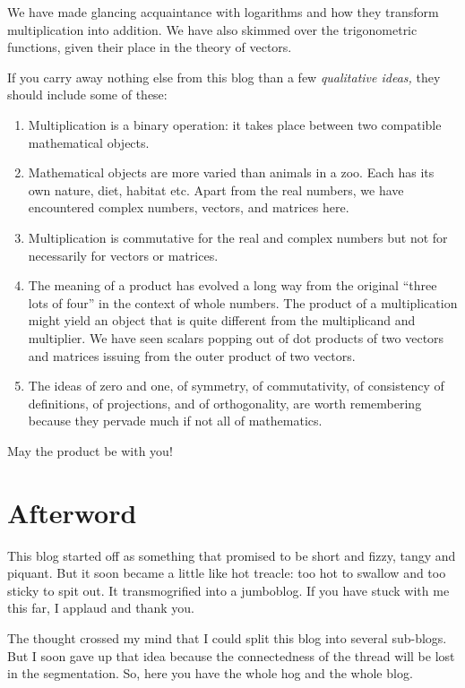 \documentclass[
  a4paper,
]{article}
\begin{document}
We have made glancing acquaintance with logarithms and how they
transform multiplication into addition. We have also skimmed over the
trigonometric functions, given their place in the theory of vectors.

If you carry away nothing else from this blog than a few
\emph{qualitative ideas,} they should include some of these:

\begin{enumerate}
\item
  Multiplication is a binary operation: it takes place between two
  compatible mathematical objects.
\item
  Mathematical objects are more varied than animals in a zoo. Each has
  its own nature, diet, habitat etc. Apart from the real numbers, we
  have encountered complex numbers, vectors, and matrices here.
\item
  Multiplication is commutative for the real and complex numbers but not
  for necessarily for vectors or matrices.
\item
  The meaning of a product has evolved a long way from the original
  ``three lots of four'' in the context of whole numbers. The product of
  a multiplication might yield an object that is quite different from
  the multiplicand and multiplier. We have seen scalars popping out of
  dot products of two vectors and matrices issuing from the outer
  product of two vectors.
\item
  The ideas of zero and one, of symmetry, of commutativity, of
  consistency of definitions, of projections, and of orthogonality, are
  worth remembering because they pervade much if not all of mathematics.
\end{enumerate}

May the product be with you!

\hypertarget{afterword}{%
\section{Afterword}\label{afterword}}

This blog started off as something that promised to be short and fizzy,
tangy and piquant. But it soon became a little like hot treacle: too hot
to swallow and too sticky to spit out. It transmogrified into a
jumboblog. If you have stuck with me this far, I applaud and thank you.

The thought crossed my mind that I could split this blog into several
sub-blogs. But I soon gave up that idea because the connectedness of the
thread will be lost in the segmentation. So, here you have the whole hog
and the whole blog.
\end{document}

